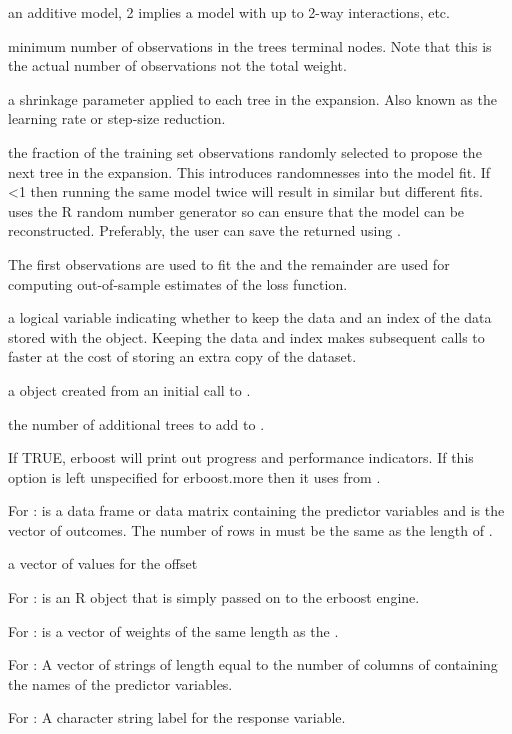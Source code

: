 \documentclass[a4paper]{book}
\begin{document}
\begin{Arguments}
\begin{ldescription}
an additive model, 2 implies a model with up to 2-way interactions, etc.
\item[\code{n.minobsinnode}] minimum number of observations in the trees terminal
nodes. Note that this is the actual number of observations not the total
weight.
\item[\code{shrinkage}] a shrinkage parameter applied to each tree in the expansion.
Also known as the learning rate or step-size reduction.
\item[\code{bag.fraction}] the fraction of the training set observations randomly
selected to propose the next tree in the expansion. This introduces randomnesses
into the model fit. If <1 then running the same model twice
will result in similar but different fits.  uses the R random number
generator so  can ensure that the model can be
reconstructed. Preferably, the user can save the returned
 using .
\item[\code{train.fraction}] The first 
observations are used to fit the  and the remainder are used for
computing out-of-sample estimates of the loss function.
\item[\code{keep.data}] a logical variable indicating whether to keep the data and
an index of the data stored with the object. Keeping the data and index makes
subsequent calls to  faster at the cost of storing an
extra copy of the dataset.
\item[\code{object}] a  object created from an initial call to
.
\item[\code{n.new.trees}] the number of additional trees to add to .
\item[\code{verbose}] If TRUE, erboost will print out progress and performance indicators.
If this option is left unspecified for erboost.more then it uses  from
.

\item[\code{x, y}] For :  is a data frame or data matrix containing the
predictor variables and  is the vector of outcomes. The number of rows
in  must be the same as the length of .
\item[\code{offset}] a vector of values for the offset
\item[\code{misc}] For :  is an R object that is simply passed on to
the erboost engine.
\item[\code{w}] For :  is a vector of weights of the same
length as the .
\item[\code{var.names}] For : A vector of strings of length equal to the
number of columns of  containing the names of the predictor variables.
\item[\code{response.name}] For : A character string label for the response
variable.

\end{ldescription}
\end{Arguments}
\end{document}
